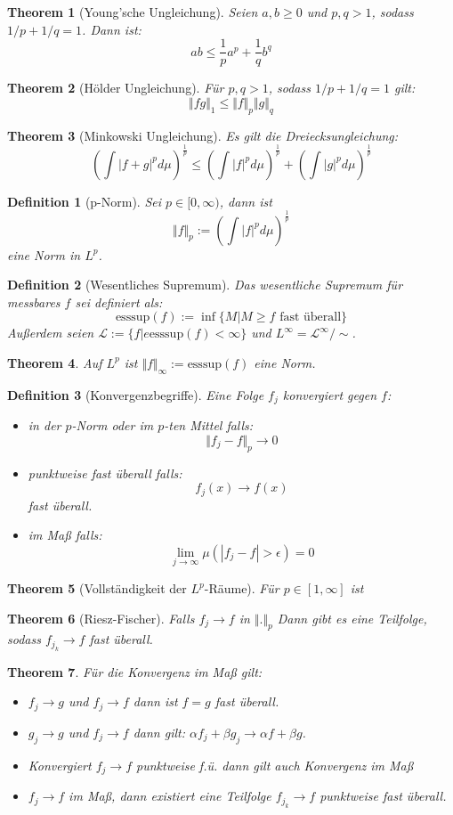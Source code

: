 \documentclass[10pt,a4paper]{article}
\newtheorem{theorem}{Theorem}
\newtheorem{definition}{Definition}
\begin{document}
\begin{theorem}[Young'sche Ungleichung]
	Seien $a, b \geq 0$ und $p, q > 1$, sodass $1/p + 1/q =1$. Dann ist: $$ab \leq \frac{1}{p}a^p+\frac{1}{q}b^q$$
\end{theorem}
\begin{theorem}[Hölder Ungleichung]
	Für $p, q > 1$, sodass $1/p + 1/q =1$ gilt:
	$$\Vert fg\Vert_1 \leq \Vert f\Vert_p \Vert g \Vert_q$$
\end{theorem}
\begin{theorem}[Minkowski Ungleichung]
	Es gilt die Dreiecksungleichung:
	$$(\int |f+g|^pd\mu)^{\frac{1}{p}} \leq (\int |f|^pd\mu)^{\frac{1}{p}} + (\int |g|^pd\mu)^{\frac{1}{p}}$$
\end{theorem}
\begin{definition}[p-Norm]
	Sei $p\in [0, \infty)$, dann ist $$\Vert f \Vert_p := (\int |f|^pd\mu)^{\frac{1}{p}}$$
	eine Norm in $L^p$.
\end{definition}
\begin{definition}[Wesentliches Supremum]
	Das wesentliche Supremum für messbares $f$ sei definiert als:
	$$\text{esssup}(f) := \inf\{M | M \geq f \text{ fast überall}\}$$
	Außerdem seien $\mathcal{L}:=\{f|e\text{esssup}(f)< \infty\}$ und $L^\infty = \mathcal{L}^\infty/\sim$.
\end{definition}
\begin{theorem}
	Auf $L^p$ ist $\Vert f\Vert_\infty := \text{esssup}(f)$ eine Norm.
\end{theorem}
\begin{definition}[Konvergenzbegriffe]
	Eine Folge $f_j$ konvergiert gegen $f$:
	\begin{itemize}
		\item in der $p$-Norm oder im $p$-ten Mittel falls:
		$$\Vert f_j -f\Vert_p \to 0$$
		\item punktweise fast überall falls:
		$$f_j (x) \to f(x)$$
		fast überall.
		\item im Maß falls:
		$$\lim_{j\to \infty} \mu(|f_j - f |> \epsilon) = 0$$
	\end{itemize}
\end{definition}
\begin{theorem}[Vollständigkeit der $L^p$-Räume]
	Für $p \in [1, \infty]$ ist 
\end{theorem}
\begin{theorem}[Riesz-Fischer]
	Falls $f_j \to f$ in $\Vert . \Vert_p$ Dann gibt es eine Teilfolge, sodass $f_{j_k} \to f$ fast überall. 
\end{theorem}
\begin{theorem}
	Für die Konvergenz im Maß gilt:
	\begin{itemize}
		\item $f_j \to g$ und $f_j \to f$ dann ist $f=g$ fast überall.
		\item $g_j \to g$ und $f_j \to f$ dann gilt: $\alpha f_j + \beta g_j \to \alpha f + \beta g$.
		\item Konvergiert $f_j \to f$ punktweise f.ü. dann gilt auch Konvergenz im Maß
		\item $f_j \to f$ im Maß, dann existiert eine Teilfolge $f_{j_k} \to f$ punktweise fast überall.
	\end{itemize}
\end{theorem}
\end{document}
